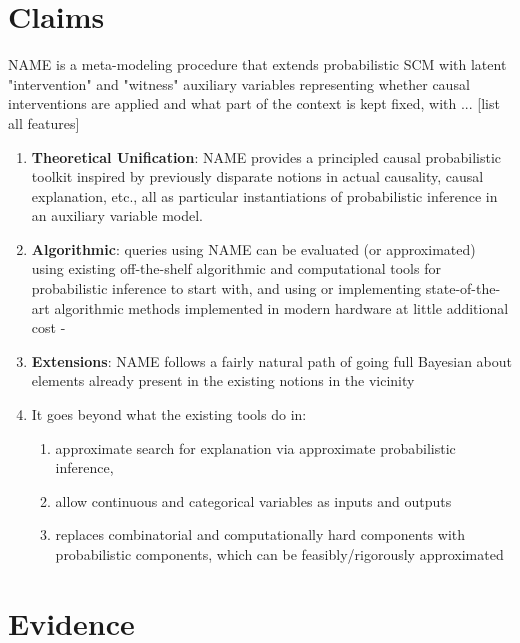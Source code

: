 \documentclass{article}
\begin{document}
\section{Claims}

NAME is a meta-modeling procedure that extends probabilistic SCM with latent "intervention" and "witness" auxiliary variables representing whether causal interventions are applied and what part of the context is kept fixed, with ... [list all features]

\begin{enumerate}
    \item \label{claim:unification} \textbf{Theoretical Unification}: NAME provides a principled causal probabilistic toolkit inspired by previously disparate notions in actual causality, causal explanation, etc., all as particular instantiations of probabilistic inference in an auxiliary variable model.
    
    \item \label{claim:algorithmic} \textbf{Algorithmic}: queries using NAME can be evaluated (or approximated) using existing off-the-shelf algorithmic and computational tools for probabilistic inference to start with, and using or implementing state-of-the-art algorithmic methods implemented in modern hardware at little additional cost - 
    \item \label{claim:extensions} \textbf{Extensions}: NAME follows a fairly natural path of going full Bayesian about elements already present in the existing notions in the vicinity
    
    \item It goes beyond what the existing tools do in:
        \begin{enumerate}
            \item \label{claim:ex-approximate} approximate search for explanation via approximate probabilistic inference,
            \item \label{claim:ex-continuous} allow continuous and categorical variables as inputs and outputs
            \item \label{claim:ex-probabilistic} replaces combinatorial and computationally hard components with probabilistic components, which can be feasibly/rigorously approximated
        \end{enumerate}
\end{enumerate}


\section{Evidence}
\end{document}
